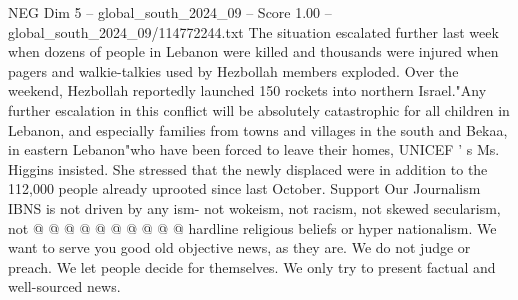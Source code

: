 \begin{textsample}{NEG Dim 5 – global\_south\_2024\_09 – Score 1.00 – global\_south\_2024\_09/114772244.txt}
The situation escalated further last week when dozens of people in Lebanon were killed and thousands were injured when pagers and walkie-talkies used by Hezbollah members exploded.
Over the weekend, Hezbollah reportedly launched 150 rockets into northern Israel."Any further escalation in this conflict will be absolutely catastrophic for all children in Lebanon, and especially families from towns and villages in the south and Bekaa, in eastern Lebanon"who have been forced to leave their homes, UNICEF ' s Ms.
Higgins insisted.
She stressed that the newly displaced were in addition to the 112,000 people already uprooted since last October.
Support Our Journalism IBNS is not driven by any ism- not wokeism, not racism, not skewed secularism, not @ @ @ @ @ @ @ @ @ @ hardline religious beliefs or hyper nationalism.
We want to serve you good old objective news, as they are.
We do not judge or preach.
We let people decide for themselves.
We only try to present factual and well-sourced news.

\end{textsample}
